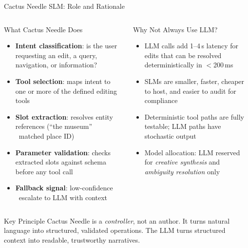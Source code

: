 \documentclass[aspectratio=169,professionalfonts]{beamer}
\newcommand{\hl}[1]{\textbf{\textcolor{ysblue}{#1}}}
\begin{document}
\begin{frame}{Cactus Needle SLM: Role and Rationale}
  \begin{columns}[T]
    \begin{block}{What Cactus Needle Does}
      \begin{itemize}
        \item \hl{Intent classification}: is the user requesting an edit,
              a query, navigation, or information?
        \item \hl{Tool selection}: maps intent to one or more of the
              defined editing tools
        \item \hl{Slot extraction}: resolves entity references
              (``the museum'' \textrightarrow\ matched place ID)
        \item \hl{Parameter validation}: checks extracted slots against
              schema before any tool call
        \item \hl{Fallback signal}: low-confidence \textrightarrow\ escalate
              to LLM with context
      \end{itemize}
    \end{block}

    \begin{block}{Why Not Always Use LLM?}
      \begin{itemize}
        \item LLM calls add 1--4\,s latency for edits that can be
              resolved deterministically in $<$200\,ms
        \item SLMs are smaller, faster, cheaper to host, and easier to
              audit for compliance
        \item Deterministic tool paths are fully testable; LLM paths
              have stochastic output
        \item Model allocation: LLM reserved for \emph{creative synthesis}
              and \emph{ambiguity resolution} only
      \end{itemize}
    \end{block}
  \end{columns}

  \vspace{0.18cm}
  \begin{alertblock}{Key Principle}
    Cactus Needle is a \emph{controller}, not an author.
    It turns natural language into structured, validated operations.
    The LLM turns structured context into readable, trustworthy narratives.
  \end{alertblock}
\end{frame}
\end{document}
